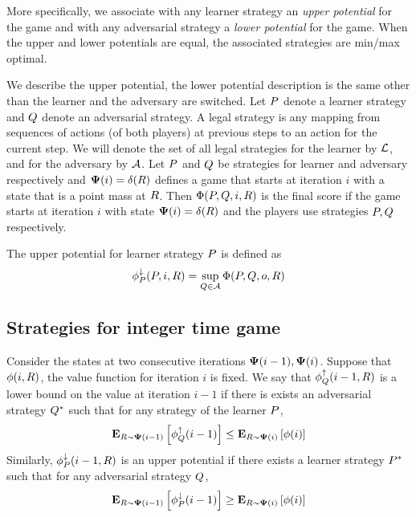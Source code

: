\documentclass{article}[12pt]
\begin{document}
More specifically, we associate with any learner strategy an {\em
  upper potential} for the game and with any adversarial strategy a
{\em lower potential} for the game. When the upper and lower
potentials are equal, the associated strategies are min/max optimal.

We describe the upper potential, the lower potential
description is the same other than the learner and the adversary
are switched. Let $P$ denote a learner
strategy and $Q$ denote an adversarial strategy. A legal strategy is
any mapping from sequences of actions (of both players) at previous steps to an
action for the current step. We will denote the set of all legal
strategies for the learner by ${\cal L}$, and for the adversary
by ${\cal A}$. Let $P$ and $Q$ be strategies for learner and
adversary respectively and ${\bf \Psi}(i) = \delta(R)$ defines a game
that starts at iteration $i$ with a state that is a point mass at
$R$.
Then $\Phi(P,Q,i,R)$ is the final score if the game starts at
iteration $i$ with state ${\bf \Psi}(i) = \delta(R)$ and the players use
strategies $P,Q$ respectively.

The upper potential for learner strategy $P$ is defined as
\[
  \phi_{P}^{\downarrow}(P,i,R) = \sup_{Q \in {\cal A}}\Phi(P,Q,o,R)
\]

\subsection{Strategies for integer time game}

Consider the states at two consecutive iterations ${\bf \Psi}(i-1),{\bf \Psi}(i)$.
Suppose that $\phi(i,R)$, the value function for iteration $i$ is fixed.
We say that $\phi_{Q}^{\uparrow}(i-1,R)$ is a lower bound on the value at iteration
$i-1$ if there is exists an adversarial strategy $Q^*$ such that
for any strategy of the learner $P$, 
$$ {\bf E}_{R \sim {\bf \Psi}(i-1)}\left[ \phi_{Q}^{\uparrow}(i-1) \right] \leq {\bf E}_{R \sim {\bf \Psi}(i)}\left[ \phi(i) \right]$$
Similarly, $\phi_{P}^{\downarrow}(i-1,R)$ is an upper potential if there exists a
learner strategy $P^*$ such that for any adversarial strategy
$Q$,
$$ {\bf E}_{R \sim {\bf \Psi}(i-1)}\left[ \phi_{P}^{\downarrow}(i-1) \right] \geq {\bf E}_{R \sim {\bf \Psi}(i)}\left[ \phi(i) \right]$$
\end{document}

